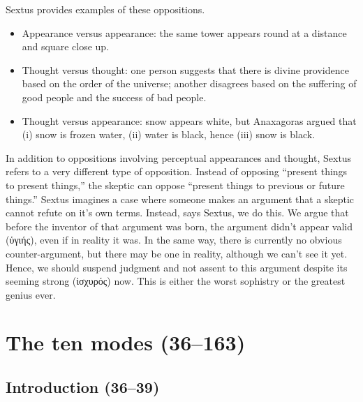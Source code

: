 Sextus provides examples of these oppositions.
\begin{itemize}
    \item Appearance versus appearance: the same tower appears round at a distance and square close up.
    \item Thought versus thought: one person suggests that there is divine providence based on the order of the universe; another disagrees based on the suffering of good people and the success of bad people.
    \item Thought versus appearance: snow appears white, but Anaxagoras argued that (i) snow is frozen water, (ii) water is black, hence (iii) snow is black.
\end{itemize}

In addition to oppositions involving perceptual appearances and thought, Sextus refers to a very different type of opposition. Instead of opposing ``present things to present things,'' the skeptic can oppose ``present things to previous or future things.'' Sextus imagines a case where someone makes an argument that a skeptic cannot refute on it's own terms. Instead, says Sextus, we do this. We argue that before the inventor of that argument was born, the argument didn't appear valid (\textgreek{ὑγιής}), even if in reality it was. In the same way, there is currently no obvious counter-argument, but there may be one in reality, although we can't see it yet. Hence, we should suspend judgment and not assent to this argument despite its seeming strong (\textgreek{ἰσχυρός}) now. This is either the worst sophistry or the greatest genius ever.\autocite{striker2001}

\section{The ten modes (36--163)}

\subsection{Introduction (36--39)\autocite[][Chapter 3]{annasbarnesmodes1985}}

